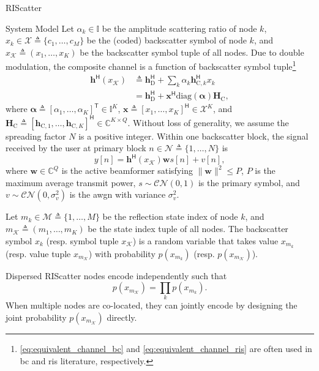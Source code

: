 \begin{section}{RIScatter}
\begin{subsection}{System Model}
		Let $\alpha_k \in \mathbb{I}$ be the amplitude scattering ratio of node $k$, $x_k \in \mathcal{X} \triangleq \{c_1,\ldots,c_M\}$ be the (coded) backscatter symbol of node $k$, and $x_{\mathcal{K}} \triangleq (x_1,\ldots,x_K)$ be the backscatter symbol tuple of all nodes.
		Due to double modulation, the composite channel is a function of backscatter symbol tuple\footnote{\eqref{eq:equivalent_channel_bc} and \eqref{eq:equivalent_channel_ris} are often used in \gls{bc} and \gls{ris} literature, respectively.}
		\begin{subequations}
			\label{eq:equivalent_channel}
			\begin{align}
				\mathbf{h}^\mathsf{H}(x_{\mathcal{K}})
				 & \triangleq \mathbf{h}_{\text{D}}^\mathsf{H} + \sum_{k} \alpha_k \mathbf{h}_{\text{C},k}^\mathsf{H} x_k \label{eq:equivalent_channel_bc}                    \\
				 & = \mathbf{h}_{\text{D}}^\mathsf{H} + \mathbf{x}^\mathsf{H} \mathrm{diag}(\mathbf{\alpha}) \mathbf{H}_{\text{C}}, \label{eq:equivalent_channel_ris}
			\end{align}
		\end{subequations}
		where $\mathbf{\alpha} \triangleq [\alpha_1,\ldots,\alpha_K]^\mathsf{T} \in \mathbb{I}^{K}$, $\mathbf{x} \triangleq [x_1,\ldots,x_K]^\mathsf{H} \in \mathcal{X}^{K}$, and $\mathbf{H}_{\text{C}} \triangleq [\mathbf{h}_{\text{C},1},\ldots,\mathbf{h}_{\text{C},K}]^\mathsf{H} \in \mathbb{C}^{K \times Q}$.
		Without loss of generality, we assume the spreading factor $N$ is a positive integer.
		Within one backscatter block, the signal received by the user at primary block $n \in \mathcal{N} \triangleq \{1,\ldots,N\}$ is
		\begin{equation}
			y[n] = \mathbf{h}^\mathsf{H}(x_{\mathcal{K}}) \mathbf{w} s[n] + v[n],
			\label{eq:receive_signal}
		\end{equation}
		where $\mathbf{w} \in \mathbb{C}^{Q}$ is the active beamformer satisfying $\lVert \mathbf{w} \rVert^2 \le P$, $P$ is the maximum average transmit power, $s \sim \mathcal{CN}(0,1)$ is the primary symbol, and $v \sim \mathcal{CN}(0,\sigma_v^2)$ is the \gls{awgn} with variance $\sigma_v^2$.

		Let $m_k \in \mathcal{M} \triangleq \{1,\ldots,M\}$ be the reflection state index of node $k$, and $m_{\mathcal{K}} \triangleq (m_1,\ldots,m_K)$ be the state index tuple of all nodes.
		The backscatter symbol $x_k$ (resp. symbol tuple $x_{\mathcal{K}}$) is a random variable that takes value $x_{m_k}$ (resp. value tuple $x_{m_{\mathcal{K}}}$) with probability $p(x_{m_k})$ (resp. $p(x_{m_{\mathcal{K}}})$).
		\begin{remark}
			Dispersed RIScatter nodes encode independently such that
			\begin{equation}
				p(x_{m_{\mathcal{K}}}) = \prod_k p(x_{m_k}).
				\label{eq:equivalent_distribution}
			\end{equation}
			When multiple nodes are co-located, they can jointly encode by designing the joint probability $p(x_{m_{\mathcal{K}}})$ directly.
			\label{re:independent_encoding}
		\end{remark}


\end{subsection}
\end{section}

